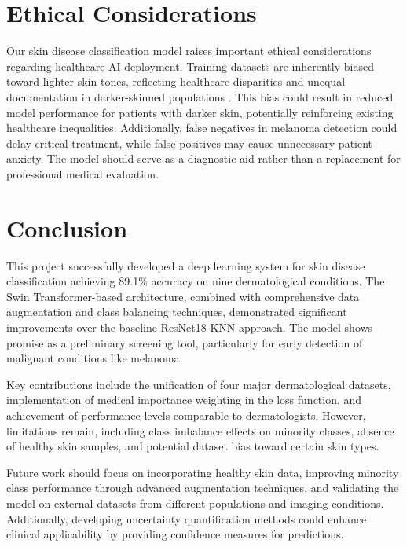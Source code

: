 \documentclass{article} %
\begin{document}
\section{Ethical Considerations}

Our skin disease classification model raises important ethical considerations regarding healthcare AI deployment. Training datasets are inherently biased toward lighter skin tones, reflecting healthcare disparities and unequal documentation in darker-skinned populations \citep{alipour2024skin}. This bias could result in reduced model performance for patients with darker skin, potentially reinforcing existing healthcare inequalities. Additionally, false negatives in melanoma detection could delay critical treatment, while false positives may cause unnecessary patient anxiety. The model should serve as a diagnostic aid rather than a replacement for professional medical evaluation.

\section{Conclusion}

This project successfully developed a deep learning system for skin disease classification achieving 89.1\% accuracy on nine dermatological conditions. The Swin Transformer-based architecture, combined with comprehensive data augmentation and class balancing techniques, demonstrated significant improvements over the baseline ResNet18-KNN approach. The model shows promise as a preliminary screening tool, particularly for early detection of malignant conditions like melanoma.

Key contributions include the unification of four major dermatological datasets, implementation of medical importance weighting in the loss function, and achievement of performance levels comparable to dermatologists. However, limitations remain, including class imbalance effects on minority classes, absence of healthy skin samples, and potential dataset bias toward certain skin types.

Future work should focus on incorporating healthy skin data, improving minority class performance through advanced augmentation techniques, and validating the model on external datasets from different populations and imaging conditions. Additionally, developing uncertainty quantification methods could enhance clinical applicability by providing confidence measures for predictions.

\label{last_page}



\end{document}
